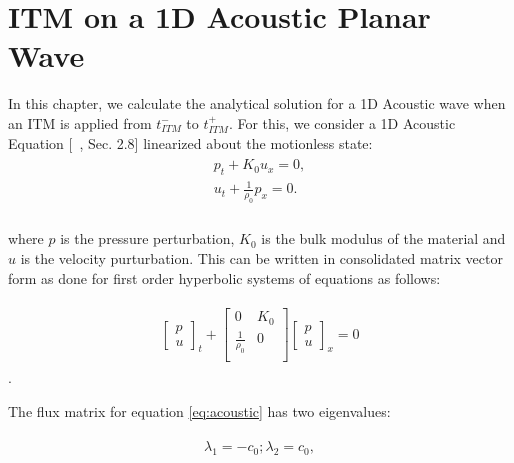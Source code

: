 
\chapter{\ac{ITM} on a 1D Acoustic Planar Wave}\label{chapter:ITMAcoustic}
In this chapter, we calculate the analytical solution for a 1D Acoustic wave when an \ac{ITM} is applied from $t_{ITM}^-$ to $t_{ITM}^+$.
For this, we consider a 1D Acoustic Equation [~\parencite{leveque_2002}, Sec. 2.8] linearized about the motionless state:
\begin{align}
    \begin{split}
        p_t + K_0u_x = 0, \\
        u_t + \frac{1}{\rho_0}p_x = 0 .\\
    \end{split}
\end{align}

where $p$ is the pressure perturbation, $K_0$ is the bulk modulus of the material and $u$ is the velocity purturbation. 
This can be written in consolidated matrix vector form as done for first order hyperbolic systems of equations as follows:

\begin{align}
    \begin{split}
    \begin{bmatrix}
        p \\
        u
    \end{bmatrix}_t + 
    \begin{bmatrix}
        0 & K_0 \\
        \frac{1}{\rho_0} & 0 \\
    \end{bmatrix}
    \begin{bmatrix}
        p \\
        u
    \end{bmatrix}_x = 0
    \end{split}
    \label{eq:acoustic}
\end{align}.

The flux matrix for equation \ref{eq:acoustic} has two eigenvalues:

\begin{align}
    \begin{split}
        \lambda_1 = -c_0; \lambda_2 = c_0,
    \end{split}
\end{align}

